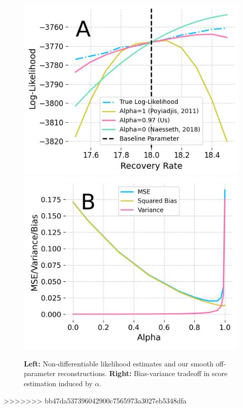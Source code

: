 \documentclass[final]{beamer}
\newlength{\colwidth}
\begin{document}
\begin{frame}[t]
\begin{columns}[t]
\begin{column}{\colwidth}
  \vspace{1ex}
    \begin{figure}
        \centering
        \includegraphics[width=0.52\linewidth]{imgs/095/mop.png}
        \includegraphics[width=0.472\linewidth]{imgs/095/biasvar.png}
        \caption{\textbf{Left:} Non-differentiable likelihood estimates and our smooth off-parameter reconstructions. 
        \textbf{Right:} Bias-variance tradeoff in score estimation induced by $\alpha$.}
        \label{fig:enter-label}
    \end{figure}
    
>>>>>>> bb47da537396042900c7565973a3027eb5348dfa

    

\end{column}
\end{columns}
\end{frame}
\end{document}
